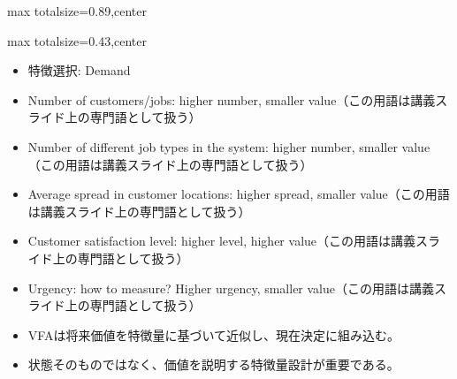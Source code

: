 \begin{minipage}[t]{0.58\textwidth}
\begin{adjustbox}{max totalsize={\textwidth}{0.89\textheight},center}
\begin{minipage}{\textwidth}
\end{minipage}
\end{adjustbox}
\end{minipage}


\clearpage
{}
\begin{minipage}[t]{0.405\textwidth}
\begin{adjustbox}{max totalsize={\textwidth}{0.43\textheight},center}
\begin{minipage}{\textwidth}\scriptsize
{}\begin{itemize}
\item 特徴選択: Demand
\item Number of customers/jobs: higher number, smaller value（この用語は講義スライド上の専門語として扱う）
\item Number of different job types in the system: higher number, smaller value（この用語は講義スライド上の専門語として扱う）
\item Average spread in customer locations: higher spread, smaller value（この用語は講義スライド上の専門語として扱う）
\item Customer satisfaction level: higher level, higher value（この用語は講義スライド上の専門語として扱う）
\item Urgency: how to measure? Higher urgency, smaller value（この用語は講義スライド上の専門語として扱う）
\end{itemize}\begin{itemize}
\item VFAは将来価値を特徴量に基づいて近似し、現在決定に組み込む。
\item 状態そのものではなく、価値を説明する特徴量設計が重要である。
\end{itemize}
\end{minipage}
\end{adjustbox}
\end{minipage}\hfill
